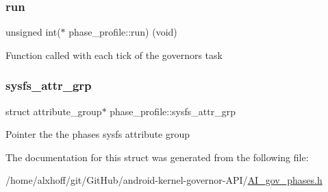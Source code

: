 \subsubsection{\texorpdfstring{run}{run}}
{\footnotesize\ttfamily unsigned int($\ast$ phase\+\_\+profile\+::run) (void)}

Function called with each tick of the governor\textquotesingle{}s task \mbox{\label{structphase__profile_a75fa703877db612110bead3a231685ee}} 
\subsubsection{\texorpdfstring{sysfs\+\_\+attr\+\_\+grp}{sysfs\_attr\_grp}}
{\footnotesize\ttfamily struct attribute\+\_\+group$\ast$ phase\+\_\+profile\+::sysfs\+\_\+attr\+\_\+grp}

Pointer the the phase\textquotesingle{}s sysfs attribute group 

The documentation for this struct was generated from the following file\+:\begin{DoxyCompactItemize}
\item 
/home/alxhoff/git/\+Git\+Hub/android-\/kernel-\/governor-\/\+A\+P\+I/\hyperlink{AI__gov__phases_8h}{A\+I\+\_\+gov\+\_\+phases.\+h}\end{DoxyCompactItemize}
